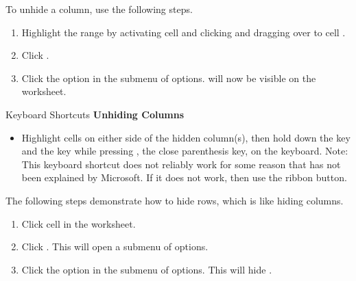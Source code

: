 To unhide a column, use the following steps.

\begin{enumbox}
	\begin{enumerate}
		\item Highlight the range  by activating cell  and clicking and dragging over to cell .
		\item Click . 
		\item Click the  option in the submenu of options.  will now be visible on the worksheet.
	\end{enumerate}
\end{enumbox}

\begin{center}
	\begin{shtcutbox}{Keyboard Shortcuts}
		\textbf{Unhiding Columns}
		\\
		\begin{itemize}
			\setlength{\itemsep}{0pt}
			\setlength{\parskip}{0pt}
			\setlength{\parsep}{0pt}
			
			\item Highlight cells on either side of the hidden column(s), then hold down the  key and the  key while pressing \fmtKeystroke{)}, the close parenthesis key, on the keyboard. Note: This keyboard shortcut does not reliably work for some reason that has not been explained by Microsoft. If it does not work, then use the ribbon button.
			
		\end{itemize}
	\end{shtcutbox}
\end{center}

The following steps demonstrate how to hide rows, which is like hiding columns.

\begin{enumbox}
	\begin{enumerate}
		\item Click cell  in the  worksheet.
		\item Click . This will open a submenu of options.
		\item Click the  option in the submenu of options. This will hide .
	\end{enumerate}
\end{enumbox}
	
